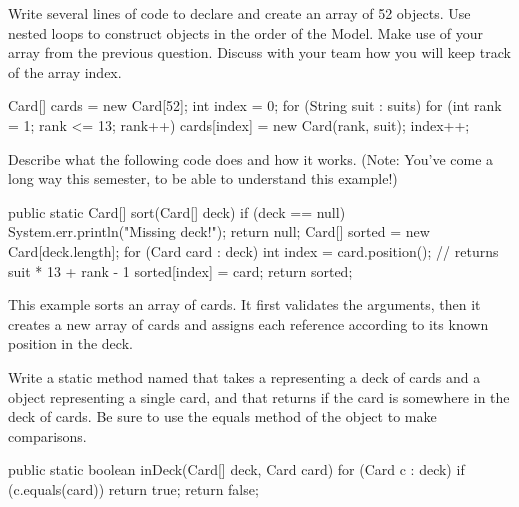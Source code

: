 \Q Write several lines of code to declare and create an array of 52  objects.
Use nested  loops to construct  objects in the order of the Model.
Make use of your  array from the previous question.
Discuss with your team how you will keep track of the array index.

\vspace*{-1ex}
\begin{answer}[11em]
\begin{javaans}
Card[] cards = new Card[52];
int index = 0;
for (String suit : suits) {
    for (int rank = 1; rank <= 13; rank++) {
        cards[index] = new Card(rank, suit);
        index++;
    }
}
\end{javaans}
\end{answer}


\Q Describe what the following code does and how it works. (Note: You've come a long way this semester, to be able to understand this example!)

\begin{javalst}
public static Card[] sort(Card[] deck) {
    if (deck == null) {
        System.err.println("Missing deck!");
        return null;
    }
    Card[] sorted = new Card[deck.length];
    for (Card card : deck) {
        int index = card.position();       // returns suit * 13 + rank - 1
        sorted[index] = card;
    }
    return sorted;
}
\end{javalst}

\begin{answer}[5em]
This example sorts an array of cards.
It first validates the arguments, then it creates a new array of cards and assigns each  reference according to its known position in the deck.
\end{answer}


\Q Write a static method named  that takes a  representing a deck of cards and a  object representing a single card, and that returns  if the card is somewhere in the deck of cards. Be sure to use the equals method of the  object to make comparisons.

\vspace{-1ex}
\begin{answer}[11em]
\begin{javaans}
public static boolean inDeck(Card[] deck, Card card) {
    for (Card c : deck) {
        if (c.equals(card)) {
            return true;
        }
    }
    return false;
}
\end{javaans}
\end{answer}
